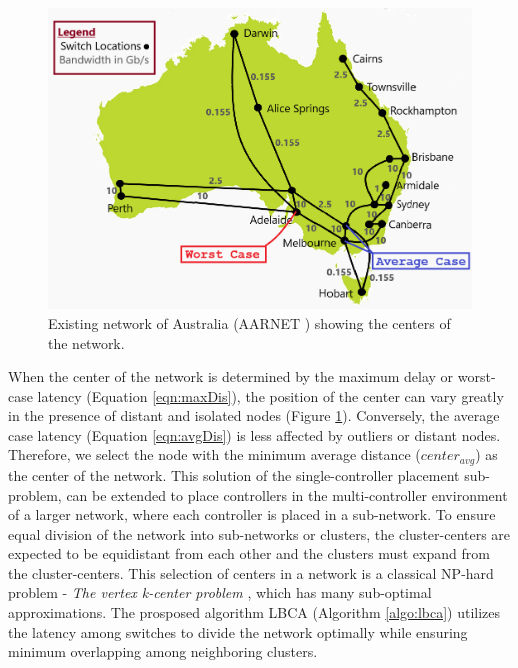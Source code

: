 \documentclass[a4paper,fleqn]{cas-dc}
\begin{document}
\begin{figure}
	\centering
	\includegraphics[width=0.9\linewidth]{Images/Aarnet.png}
	\caption{Existing network of Australia (AARNET \cite{knight2011internet}) showing the centers of the network.}
	\label{fig:aarnetcc}
\end{figure}

When the center of the network is determined by the maximum delay or worst-case latency (Equation \ref{eqn:maxDis}), the position of the center can vary greatly in the presence of distant and isolated nodes (Figure \ref{fig:aarnetcc}). Conversely, the average case latency (Equation \ref{eqn:avgDis}) is less affected by outliers or distant nodes. Therefore, we select the node with the minimum average distance ($center_{avg}$) as the center of the network. This solution of the single-controller placement sub-problem, can be extended to place controllers in the multi-controller environment of a larger network, where each controller is placed in a sub-network. To ensure equal division of the network into sub-networks or clusters, the cluster-centers are expected to be equidistant from each other and the clusters must expand from the cluster-centers. This selection of centers in a network is a classical NP-hard problem - \textit{The vertex k-center problem} \cite{kariv1979algorithmic}, which has many sub-optimal approximations. The prosposed algorithm LBCA (Algorithm \ref{algo:lbca}) utilizes the latency among switches to divide the network optimally while ensuring minimum overlapping among neighboring clusters.
\end{document}
